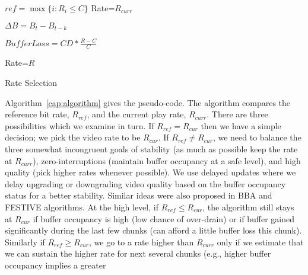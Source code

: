 \begin{algorithm} [t]
\SetAlgoLined
${ref} = \max \{i: R_i \le C\}$\;
 {
   Rate=$R_{curr}$
 }
 {
 $\Delta B = B_{t} -B_{t-k}$\;
 {
 $BufferLoss=CD*\frac{R-C}{C}$\;

 {Rate=$R$}
 }
 }
\caption{Rate Selection} \label{cap:algorithm}
\end{algorithm} 
Algorithm~\ref{cap:algorithm} gives the pseudo-code. 
The algorithm 
compares the reference bit rate, $R_{ref}$, and the current play rate,
$R_{curr}$. There are three possibilities which we examine in turn.
If $R_{ref}= R_{cur}$ then we have a simple decision; we pick the
video rate to be $ R_{cur}$.
If $R_{ref} \neq R_{cur}$, we need to balance the three somewhat
incongruent goals of stability
(as much as possible keep the rate at $R_{curr}$), zero-interruptions
(maintain buffer occupancy at a safe level), and high quality (pick
higher rates whenever possible). 
We use delayed updates where we delay upgrading or downgrading video quality
based on the buffer occupancy status for a better stability. Similar ideas were also proposed in BBA \cite{BBA} and FESTIVE \cite{Festive} algorithms. 
At the high level, if $R_{ref} \le R_{cur}$, the algorithm still
stays at $R_{cur}$ if buffer occupancy is high (low chance of
over-drain) or if buffer gained significantly during the last few
chunks (can afford a little buffer loss this chunk). 
Similarly if $R_{ref} \ge R_{cur}$, we go to a rate higher than
$R_{curr}$ only if we estimate that we can sustain the higher rate for
next several chunks (e.g., higher buffer occupancy implies a greater
